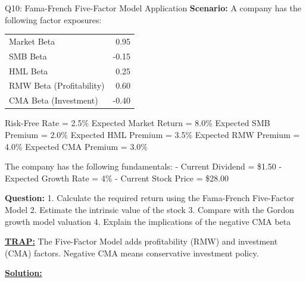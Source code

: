 \documentclass{beamer}
\renewcommand{\scriptsize}{\fontsize{6pt}{7pt}\selectfont}
\begin{document}
	\begin{frame}{Q10: Fama-French Five-Factor Model Application}
		\scriptsize
		\textbf{Scenario:} A company has the following factor exposures:
		
		\begin{tabular}{lr}
			Market Beta & 0.95 \\
			SMB Beta & -0.15 \\
			HML Beta & 0.25 \\
			RMW Beta (Profitability) & 0.60 \\
			CMA Beta (Investment) & -0.40 \\
		\end{tabular}
		
		Risk-Free Rate = 2.5\%
		Expected Market Return = 8.0\%
		Expected SMB Premium = 2.0\%
		Expected HML Premium = 3.5\%
		Expected RMW Premium = 4.0\%
		Expected CMA Premium = 3.0\%
		
		The company has the following fundamentals:
		- Current Dividend = \$1.50
		- Expected Growth Rate = 4\%
		- Current Stock Price = \$28.00
		
		\textbf{Question:}
		1. Calculate the required return using the Fama-French Five-Factor Model
		2. Estimate the intrinsic value of the stock
		3. Compare with the Gordon growth model valuation
		4. Explain the implications of the negative CMA beta
		
		\vspace{2pt}
		\underline{\textbf{TRAP:}} The Five-Factor Model adds profitability (RMW) and investment (CMA) factors. Negative CMA means conservative investment policy.
		
		\vspace{4pt}
		\underline{\textbf{Solution:}}
	\end{frame}
	
\end{document}
